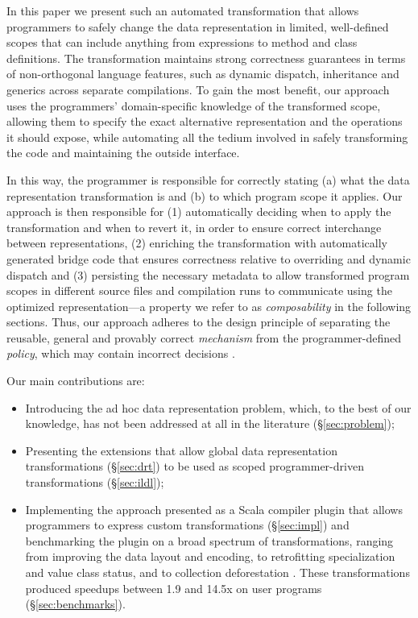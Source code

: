 In this paper we present such an automated transformation that allows programmers to safely change the data representation in limited, well-defined scopes that can include anything from expressions to method and class definitions. The transformation maintains strong correctness guarantees in terms of non-orthogonal language features, such as dynamic dispatch, inheritance and generics across separate compilations. To gain the most benefit, our approach uses the programmers' domain-specific knowledge of the transformed scope, allowing them to specify the exact alternative representation and the operations it should expose, while automating all the tedium involved in safely transforming the code and maintaining the outside interface.

In this way, the programmer is responsible for correctly stating (a) what the data representation transformation is and (b) to which program scope it applies. Our approach is then responsible for (1) automatically deciding when to apply the transformation and when to revert it, in order to ensure correct interchange between representations, (2) enriching the transformation with automatically generated bridge code that ensures correctness relative to overriding and dynamic dispatch and (3) persisting the necessary metadata to allow transformed program scopes in different source files and compilation runs to communicate using the optimized representation---a property we refer to as \emph{composability} in the following sections. Thus, our approach adheres to the design principle of separating the reusable, general and provably correct \emph{mechanism} from the programmer-defined \emph{policy}, which may contain incorrect decisions \cite{lampson-mechanism-policy}.

Our main contributions are:
\begin{itemize}
  \item Introducing the ad hoc data representation problem, which, to the best of our knowledge, has not been addressed at all in the literature (\S\ref{sec:problem});
  \item Presenting the extensions that allow global data representation transformations (\S\ref{sec:drt}) to be used as scoped programmer-driven transformations (\S\ref{sec:ildl});
  \item Implementing the approach presented as a Scala compiler plugin \cite{ildl-plugin} that allows programmers to express custom transformations (\S\ref{sec:impl}) and benchmarking the plugin on a broad spectrum of transformations, ranging from improving the data layout and encoding, to retrofitting specialization and value class status, and to collection deforestation \cite{wadler-deforestation}. These transformations produced  speedups between 1.9 and 14.5x on user programs (\S\ref{sec:benchmarks}).
\end{itemize}

